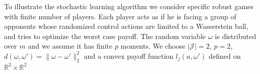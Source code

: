 \documentclass{article}
\begin{document}
To illustrate the stochastic learning algorithm we consider specific robust games with finite number of players. Each player acts as if he is facing a group of opponents whose randomized control actions are limited to a Wasserstein ball, and tries to optimize the worst case payoff. The random variable $\omega$ is distributed over $m$ and we assume it has finite $p$ moments. We choose $|\mathcal{J}|=2$, $p=2$, $d(\omega,\omega')=\| \omega-\omega'\|_2^2$ and a convex payoff function $l_j(a,\omega')$ defined on $\mathbb{R}^2 \times \mathbb{R}^2$
\end{document}
